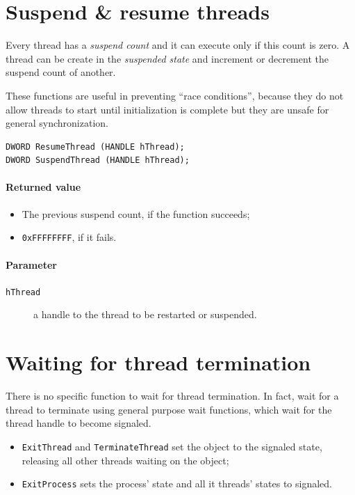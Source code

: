 \section{Suspend \& resume threads}
Every thread has a \emph{suspend count} and it can execute only if this count is zero. A thread can be create in the \emph{suspended state} and increment or decrement the suspend count of another.

These functions are useful in preventing ``race conditions'', because they do not allow threads to start until initialization is complete but they are unsafe for general synchronization.

\begin{verbatim}
DWORD ResumeThread (HANDLE hThread);
DWORD SuspendThread (HANDLE hThread);
\end{verbatim}

\paragraph{Returned value}
\begin{itemize}
\item The previous suspend count, if the function succeeds;
\item \texttt{0xFFFFFFFF}, if it fails.
\end{itemize}

\paragraph{Parameter}
\begin{description}
\item [\texttt{hThread}] a handle to the thread to be restarted or suspended.
\end{description}

\section{Waiting for thread termination}
There is no specific function to wait for thread termination. In fact, wait for a thread to terminate using general purpose wait functions, which wait for the thread handle to become signaled.
\begin{itemize}
\item \texttt{ExitThread} and \texttt{TerminateThread} set the object to the signaled state, releasing all other threads waiting on the object;
\item \texttt{ExitProcess} sets the process' state and all it threads' states to signaled.
\end{itemize}

